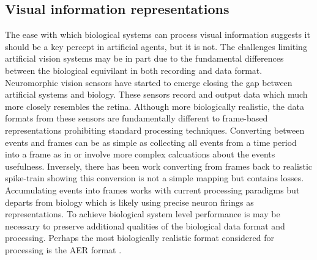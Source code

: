 

\subsection{Visual information representations}

The ease with which biological systems can process visual information suggests it should be a key percept in artificial agents, but it is not.
The challenges limiting artificial vision systems may be in part due to the fundamental differences between the biological equivilant in both recording and data format.
Neuromorphic vision sensors have started to emerge closing the gap between artificial systems and biology\cite{mahowald1992vlsi}.
These sensors record and output data which much more closely resembles the retina\cite{akolkar2015can}. 
Although more biologically realistic, the data formats from these sensors are fundamentally different to frame-based representations prohibiting standard processing techniques. 
Converting between events and frames can be as simple as collecting all events from a time period into a frame as in \cite{kogler2009bio, schraml2010dynamic} or involve more complex calcuations about the events usefulness\cite{mueggler2015lifetime}.
Inversely, there has been work converting from frames back to realistic spike-train\cite{afshar2013ripple} showing this conversion is not a simple mapping but contains losses\cite{akolkar2015can}. 
Accumulating events into frames works with current processing paradigms but departs from biology which is likely using precise neuron firings as representations\cite{akolkar2015can}.
To achieve biological system level performance is may be necessary to preserve additional qualities of the biological data format and processing. 
Perhaps the most biologically realistic format considered for processing is the AER format \cite{mahowald1992vlsi}.
